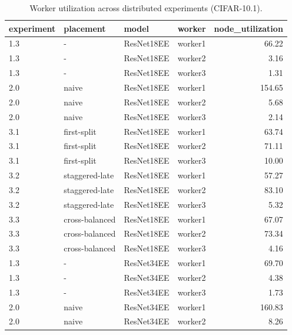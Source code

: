 \begin{table}
\centering
\caption{Worker utilization across distributed experiments (CIFAR-10.1).}
\label{tab:distributed-node-utilization-cifar10-1}
\begin{tabular}{llllr}
\toprule
experiment &      placement &      model &  worker &  node\_utilization \\
\midrule
       1.3 &              - & ResNet18EE & worker1 &             66.22 \\
       1.3 &              - & ResNet18EE & worker2 &              3.16 \\
       1.3 &              - & ResNet18EE & worker3 &              1.31 \\
       2.0 &          naive & ResNet18EE & worker1 &            154.65 \\
       2.0 &          naive & ResNet18EE & worker2 &              5.68 \\
       2.0 &          naive & ResNet18EE & worker3 &              2.14 \\
       3.1 &    first-split & ResNet18EE & worker1 &             63.74 \\
       3.1 &    first-split & ResNet18EE & worker2 &             71.11 \\
       3.1 &    first-split & ResNet18EE & worker3 &             10.00 \\
       3.2 & staggered-late & ResNet18EE & worker1 &             57.27 \\
       3.2 & staggered-late & ResNet18EE & worker2 &             83.10 \\
       3.2 & staggered-late & ResNet18EE & worker3 &              5.32 \\
       3.3 & cross-balanced & ResNet18EE & worker1 &             67.07 \\
       3.3 & cross-balanced & ResNet18EE & worker2 &             73.34 \\
       3.3 & cross-balanced & ResNet18EE & worker3 &              4.16 \\
       1.3 &              - & ResNet34EE & worker1 &             69.70 \\
       1.3 &              - & ResNet34EE & worker2 &              4.38 \\
       1.3 &              - & ResNet34EE & worker3 &              1.73 \\
       2.0 &          naive & ResNet34EE & worker1 &            160.83 \\
       2.0 &          naive & ResNet34EE & worker2 &              8.26 \\

\end{tabular}
\end{table}
